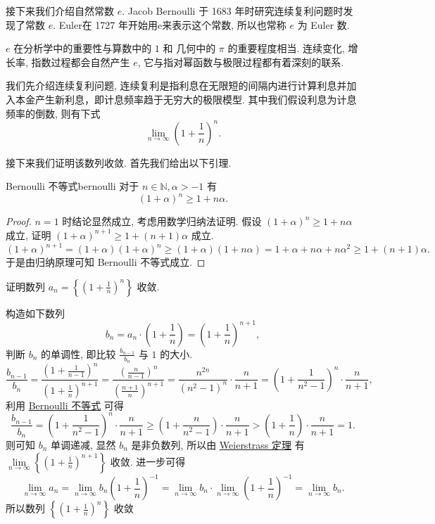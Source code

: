 \documentclass[cn,toc=twocol]{elegantbook}
\newcommand{\N}{\mathbb{N}}
\begin{document}
接下来我们介绍自然常数 $e$. Jacob Bernoulli 于 1683 年时研究连续复利问题时发现了常数 $e$. Euler在 1727 年开始用e来表示这个常数, 所以也常称 $e$ 为 Euler 数.

$e$ 在分析学中的重要性与算数中的 $1$ 和 几何中的 $\pi$ 的重要程度相当. 连续变化, 增长率, 指数过程都会自然产生 $e$, 它与指对幂函数与极限过程都有着深刻的联系.

我们先介绍连续复利问题, 连续复利是指利息在无限短的间隔内进行计算利息并加入本金产生新利息，即计息频率趋于无穷大的极限模型. 其中我们假设利息为计息频率的倒数, 则有下式
\[
	\lim_{n\to\infty} \left(1 + \frac{1}{n}\right)^n.
\]

接下来我们证明该数列收敛. 首先我们给出以下引理.
\begin{lemma}{Bernoulli 不等式}{bernoulli}
	对于 $n \in \N, \alpha > -1$ 有
	\[
		(1 + \alpha)^n \ge 1 + n\alpha.
	\]	
\end{lemma}
\begin{proof}
	$n = 1$ 时结论显然成立, 考虑用数学归纳法证明. 假设 $(1 + \alpha)^n \ge 1 + n\alpha$ 成立, 证明 $(1 + \alpha)^{n+1} \ge 1 + (n + 1)\alpha$ 成立.
	\[
		(1 + \alpha)^{n+1} = (1 + \alpha) (1 + \alpha)^n \ge (1 + \alpha) (1 + n\alpha) = 1 + \alpha + n\alpha + n \alpha^2 \ge 1 + (n + 1)\alpha.
	\]
	于是由归纳原理可知 Bernoulli 不等式成立.
\end{proof}

\begin{example}
	证明数列 $a_n = \left\{ \left(1 + \frac{1}{n}\right)^n \right\}$ 收敛.
\end{example}

\begin{solution}
	构造如下数列 
	\[
		b_n = a_n \cdot \left(1 + \frac{1}{n}\right) = \left(1 + \frac{1}{n}\right)^{n+1},
	\]
	判断 $b_n$ 的单调性, 即比较 $\frac{b_{n-1}}{b_n}$ 与 $1$ 的大小.
	\[
		\frac{b_{n-1}}{b_n} = \frac{\left(1 + \frac{1}{n - 1}\right)^{n}}{\left(1 + \frac{1}{n}\right)^{n+1}} = \frac{\left(\frac{n}{n - 1}\right)^{n}}{\left(\frac{n + 1}{n}\right)^{n+1}} = \frac{n^{2n}}{(n^2 -1)^n} \cdot \frac{n}{n + 1} = \left(1 +\frac{1}{n^2 -1}\right)^n \cdot \frac{n}{n + 1},
	\]
	利用 \hyperref[lem:bernoulli]{Bernoulli 不等式} 可得
	\[
		\frac{b_{n-1}}{b_n} = \left(1 +\frac{1}{n^2 -1}\right)^n \cdot \frac{n}{n + 1} \ge \left(1 + \frac{n}{n^2 -1}\right) \cdot \frac{n}{n + 1} > \left(1 + \frac{1}{n}\right) \cdot \frac{n}{n + 1} = 1.
	\]
	则可知 $b_n$ 单调递减, 显然 $b_n$ 是非负数列, 所以由 \hyperref[thm:R6]{Weierstrass 定理} 有 $\lim\limits_{n\to\infty}\left\{ \left(1 + \frac{1}{n}\right)^{n+1} \right\}$ 收敛. 进一步可得
	\[
		\lim\limits_{n\to\infty} a_n = \lim_{n\to\infty} b_n \left(1 + \frac{1}{n}\right)^{-1} = \lim_{n\to\infty} b_n \cdot \lim_{n\to\infty}\left(1 + \frac{1}{n}\right)^{-1} = \lim_{n\to\infty} b_n.
	\]
	所以数列 $\left\{ \left(1 + \frac{1}{n}\right)^n \right\}$ 收敛
\end{solution}
\end{document}
